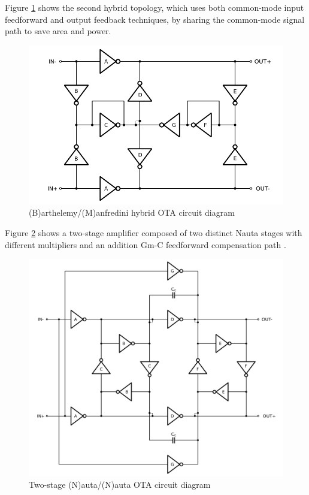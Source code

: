 \documentclass[conference]{IEEEtran}
\begin{document}
	Figure \ref{fig:barthmanf:sch} shows the second hybrid topology, which uses both common-mode input feedforward and output feedback techniques, by sharing the common-mode signal path to save area and power.
	
	
	
	\begin{figure}[!htbp]
		\centerline{\includegraphics[scale=0.50]{circuits/barthmanf.pdf}}
		\caption{(B)arthelemy/(M)anfredini hybrid OTA circuit diagram}
		\label{fig:barthmanf:sch}
	\end{figure}
	
	Figure \ref{fig:nautanauta:sch} shows a two-stage amplifier composed of two distinct Nauta stages with different multipliers and an addition Gm-C feedforward compensation path \cite{you1997multistage}.
	
	\begin{figure}[!htbp]
		\centerline{\includegraphics[scale=0.50]{circuits/nautanauta.pdf}}
		\caption{Two-stage (N)auta/(N)auta OTA circuit diagram}
		\label{fig:nautanauta:sch}
	\end{figure}
	
\end{document}
